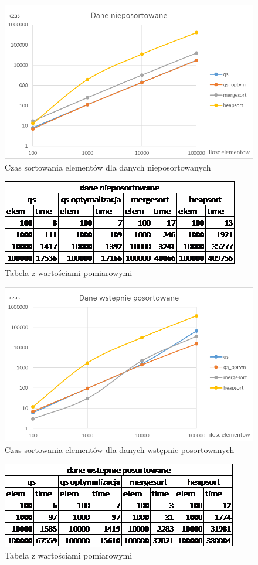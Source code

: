 \documentclass[a4paper,10pt]{scrartcl}
\begin{document}
\begin{landscape}
\begin{figure}
 \centering
  \includegraphics[scale=1]{wyk1}
 \caption{Czas sortowania elementów dla danych nieposortowanych}
\end{figure}

\pagebreak

\begin{figure}
 \centering
  \includegraphics[scale=1]{tab1}
 \caption{Tabela z wartościami pomiarowymi}
\end{figure}

\begin{figure}
 \centering
  \includegraphics[scale=1]{wyk2}
 \caption{Czas sortowania elementów dla danych wstępnie posortowanych}
\end{figure}

\pagebreak

\begin{figure}
 \centering
  \includegraphics[scale=1]{tab2}
 \caption{Tabela z wartościami pomiarowymi}
\end{figure}
\end{landscape}
\end{document}
